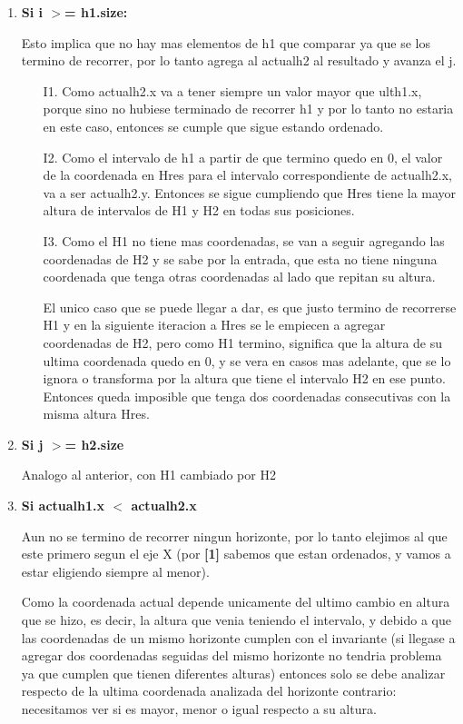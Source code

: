 \begin{enumerate}
\item \textbf{Si i $>$= h1.size:}

Esto implica que no hay mas elementos de h1 que comparar ya que se los termino de recorrer, por lo tanto agrega al actualh2 al resultado y avanza el j. 
\begin{itemize}
\item[I1.] Como actualh2.x va a tener siempre un valor mayor que ulth1.x, porque sino no hubiese terminado de recorrer h1 y por lo tanto no estaria en este caso, entonces se cumple que sigue estando ordenado.
\item[I2.] Como el intervalo de h1 a partir de que termino quedo en 0, el valor de la coordenada en Hres para el intervalo correspondiente de actualh2.x, va a ser actualh2.y. Entonces se sigue cumpliendo que Hres tiene la mayor altura de intervalos de H1 y H2 en todas sus posiciones.
\item[I3.] Como el H1 no tiene mas coordenadas, se van a seguir agregando las coordenadas de H2 y se sabe por la entrada, que esta no tiene ninguna coordenada que tenga otras coordenadas al lado que repitan su altura. 

El unico caso que se puede llegar a dar, es que justo termino de recorrerse H1 y en la siguiente iteracion a Hres se le empiecen a agregar coordenadas de H2, pero como H1 termino, significa que la altura de su ultima coordenada quedo en 0, y se vera en casos mas adelante, que se lo ignora o transforma por la altura que tiene el intervalo H2 en ese punto. Entonces queda imposible que tenga dos coordenadas consecutivas con la misma altura Hres.\\
\end{itemize}
\item \textbf{Si j $>$= h2.size}

Analogo al anterior, con H1 cambiado por H2	\\

\item \textbf{Si actualh1.x $<$ actualh2.x}

Aun no se termino de recorrer ningun horizonte, por lo tanto elejimos al que este primero segun el eje X (por \textbf{[1]} sabemos que estan ordenados, y vamos a estar eligiendo siempre al menor). 

Como la coordenada actual depende unicamente del ultimo cambio en altura que se hizo, es decir, la altura que venia teniendo el intervalo, y debido a que las coordenadas de un mismo horizonte cumplen con el invariante (si llegase a agregar dos coordenadas seguidas del mismo horizonte no tendria problema ya que cumplen que tienen diferentes alturas) entonces solo se debe analizar respecto de la ultima coordenada analizada del horizonte contrario: necesitamos ver si es mayor, menor o igual respecto a su altura.


\end{enumerate}
